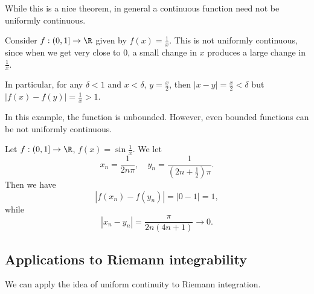 \documentclass[a4paper]{article}
\begin{document}
While this is a nice theorem, in general a continuous function need not be uniformly continuous.

\begin{eg}
  Consider $f: (0, 1] \to \R$ given by $f(x) = \frac{1}{x}$. This is not uniformly continuous, since when we get very close to $0$, a small change in $x$ produces a large change in $\frac{1}{x}$.

  In particular, for any $\delta < 1$ and $x < \delta$, $y = \frac{x}{2}$, then $|x - y| = \frac{x}{2} < \delta$ but $|f(x) - f(y)| = \frac{1}{x} > 1$.
\end{eg}

In this example, the function is unbounded. However, even bounded functions can be not uniformly continuous.
\begin{eg}
  Let $f: (0, 1] \to \R$, $f(x) = \sin \frac{1}{x}$. We let
  \[
    x_n = \frac{1}{2n\pi},\quad y_n = \frac{1}{(2n + \frac{1}{2})\pi}.
  \]
  Then we have
  \[
    |f(x_n) - f(y_n)| = |0 - 1| = 1,
  \]
  while
  \[
    |x_n - y_n| = \frac{\pi}{2n(4n + 1)} \to 0.
  \]
\end{eg}

\subsection{Applications to Riemann integrability}
We can apply the idea of uniform continuity to Riemann integration.
\end{document}
